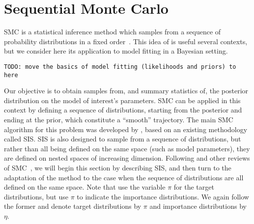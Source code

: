 \section{Sequential Monte Carlo}

\Gls{SMC} is a statistical inference method which samples from a sequence of
probability distributions in a fixed order~\autocite{del2006sequential}. This
idea of  is useful several contexts, but we consider
here its application to model fitting in a Bayesian setting. 

\texttt{TODO: move the basics of model fitting (likelihoods and priors) to here}

Our objective is to obtain samples from, and summary statistics of, the
posterior distribution on the model of interest's parameters. \gls{SMC} can be
applied in this context by defining a sequence of distributions, starting from
the posterior and ending at the prior, which constitute a ``smooth''
trajectory. The main \gls{SMC} algorithm for this problem was developed by
\textcite{del2006sequential}, based on an existing methodology called
\gls{SIS}. \gls{SIS} is also designed to sample from a sequence of
distributions, but rather than all being defined on the same space (such as
model parameters), they are defined on nested spaces of increasing dimension.
Following \textcite{del2006sequential} and other reviews of
\gls{SMC}~\autocite{doucet2001introduction}, we will begin this section by
describing \gls{SIS}, and then turn to the adaptation of the method to the case
when the sequence of distributions are all defined on the same space. Note that
\textcite{del2006sequential} use the variable $\pi$ for the target
distributions, but \textcite{doucet2001introduction} use $\pi$ to indicate the
importance distributions. We again follow the former and denote target
distributions by $\pi$ and importance distributions by $\eta$.

